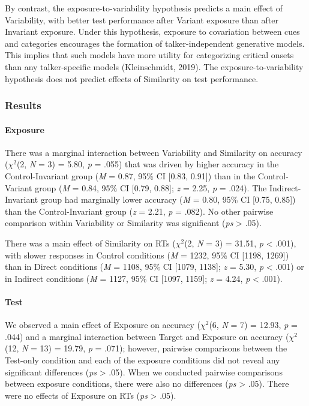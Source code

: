 \documentclass[
  12pt,
  twoside]{article}
\begin{document}
By contrast, the exposure-to-variability hypothesis predicts a main effect of Variability, with better test performance after Variant exposure than after Invariant exposure.
Under this hypothesis, exposure to covariation between cues and categories encourages the formation of talker-independent generative models.
This implies that such models have more utility for categorizing critical onsets than any talker-specific models (Kleinschmidt, 2019).
The exposure-to-variability hypothesis does not predict effects of Similarity on test performance.

\hypertarget{results}{%
\subsubsection{Results}\label{results}}

\hypertarget{exposure}{%
\paragraph{Exposure}\label{exposure}}

There was a marginal interaction between Variability and Similarity on accuracy (\(\chi^2\)(2, \emph{N} = 3) = 5.80, \emph{p} = .055) that was driven by higher accuracy in the Control-Invariant group (\emph{M} = 0.87, 95\% CI {[}0.83, 0.91{]}) than in the Control-Variant group (\emph{M} = 0.84, 95\% CI {[}0.79, 0.88{]}; \emph{z} = 2.25, \emph{p} = .024).
The Indirect-Invariant group had marginally lower accuracy (\emph{M} = 0.80, 95\% CI {[}0.75, 0.85{]}) than the Control-Invariant group (\emph{z} = 2.21, \emph{p} = .082).
No other pairwise comparison within Variability or Similarity was significant (\emph{ps} \textgreater{} .05).

There was a main effect of Similarity on RTs (\(\chi^2\)(2, \emph{N} = 3) = 31.51, \emph{p} \textless{} .001), with slower responses in Control conditions (\emph{M} = 1232, 95\% CI {[}1198, 1269{]}) than in Direct conditions (\emph{M} = 1108, 95\% CI {[}1079, 1138{]}; \emph{z} = 5.30, \emph{p} \textless{} .001) or in Indirect conditions (\emph{M} = 1127, 95\% CI {[}1097, 1159{]}; \emph{z} = 4.24, \emph{p} \textless{} .001).

\hypertarget{test}{%
\paragraph{Test}\label{test}}

We observed a main effect of Exposure on accuracy (\(\chi^2\)(6, \emph{N} = 7) = 12.93, \emph{p} = .044) and a marginal interaction between Target and Exposure on accuracy (\(\chi^2\)(12, \emph{N} = 13) = 19.79, \emph{p} = .071); however, pairwise comparisons between the Test-only condition and each of the exposure conditions did not reveal any significant differences (\emph{ps} \textgreater{} .05).
When we conducted pairwise comparisons between exposure conditions, there were also no differences (\emph{ps} \textgreater{} .05).
There were no effects of Exposure on RTs (\emph{ps} \textgreater{} .05).
\end{document}

